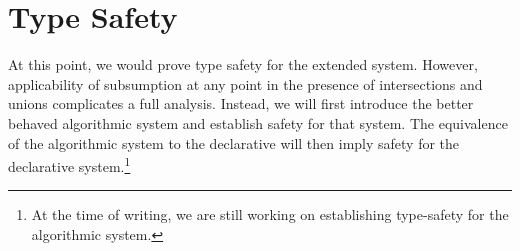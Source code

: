 
\section{Type Safety}
\label{refinements:semantics}

At this point, we would prove type safety for the extended system. However, applicability of subsumption at any point in the presence of intersections and unions complicates a full analysis. Instead, we will first introduce the better behaved algorithmic system and establish safety for that system. The equivalence of the algorithmic system to the declarative will then imply safety for the declarative system.\footnote{At the time of writing, we are still working on establishing type-safety for the algorithmic system.}

